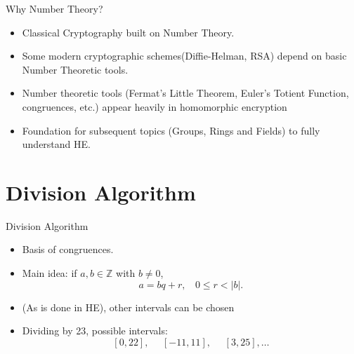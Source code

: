 \documentclass[ %
 usenames,dvipsnames,
aspectratio=169,11pt ]{beamer}
\newenvironment{stepitemize}{\begin{itemize}[<+->]}{\end{itemize} }
\newcommand{\Z}{\mathbb{Z}}
\begin{document}
\begin{frame}{Why Number Theory?}
\begin{stepitemize}
    \item Classical Cryptography built on Number Theory.
    \item Some modern cryptographic schemes(Diffie-Helman, RSA) depend on basic Number Theoretic tools.
    \item Number theoretic tools (Fermat's Little Theorem, Euler's Totient Function, congruences, etc.) appear heavily in homomorphic encryption
    \item Foundation for subsequent topics (Groups, Rings and Fields) to fully understand HE.
\end{stepitemize}
\end{frame}

\begin{frame}


\end{frame}


\section{Division Algorithm}

\begin{frame}{Division Algorithm}
\begin{stepitemize}
    \item Basis of congruences.
    \item Main idea: if $a,b \in \Z$ with $b\neq 0$,
    $$a=bq+r, \:\:\:\: 0\leq r <|b|.$$
    \item (As is done in HE), other intervals can be chosen
    \item Dividing by 23, possible intervals:
    $$[0,22], \:\:\:\:\:\: [-11,11], \:\:\:\:\:\: [3,25], \dots $$
\end{stepitemize}
\end{frame}
\end{document}
